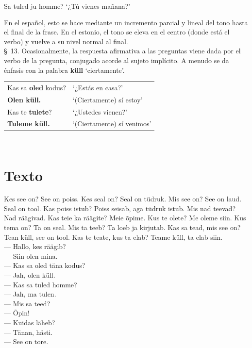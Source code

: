 \begin{center}
Sa tuled ju homme? `¿Tú vienes mañana?'\\
\end{center}

En el español, esto se hace mediante un incremento parcial y lineal del tono hasta el final de la frase. En el estonio, el tono se eleva en el centro (donde está el verbo) y vuelve a su nivel normal al final.\\

\S\ 13. Ocasionalmente, la respuesta afirmativa a las preguntas viene dada por el verbo de la pregunta, conjugado acorde al sujeto implícito. A menudo se da énfasis con la palabra \textbf{küll} `ciertamente'. 

\begin{center}
\begin{tabular}{ l l }
	Kas sa \textbf{oled} kodus? & `¿Estás en casa?'\\
	\textbf{Olen küll.}			& `(Ciertamente) sí estoy'\\
	Kas te \textbf{tulete}? 	& `¿Ustedes vienen?'\\
	\textbf{Tuleme küll.}		& `(Ciertamente) sí venimos'
\end{tabular}\\ \bigskip
\end{center}

\section*{\Large{Texto}}

Kes see on? See on poiss. Kes seal on? Seal on tüdruk. Mis see on? See on laud. Seal on tool. Kas poiss istub? Poiss seisab, aga tüdruk istub. Mis nad teevad? Nad räägivad. Kas teie ka räägite? Meie õpime. Kus te olete? Me oleme siin. Kus tema on? Ta on seal. Mis ta teeb? Ta loeb ja kirjutab. Kas sa tead, mis see on? Tean küll, see on tool. Kas te teate, kus ta elab? Teame küll, ta elab siin.\\

—	Hallo, kes räägib? \\
—	Siin olen mina. \\
—	Kas sa oled täna kodus? \\
—	Jah, olen küll. \\
—	Kas sa tuled homme? \\
—	Jah, ma tulen. \\
—	Mis sa teed? \\
—	Õpin! \\
—	Kuidas läheb? \\
—	Tänan, hästi. \\
—	See on tore. \\

